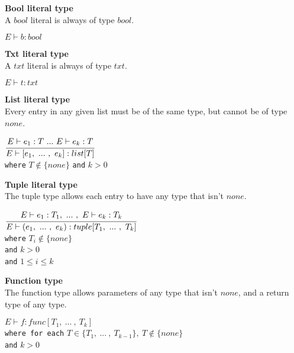\textbf{Bool literal type}\\
A $bool$ literal is always of type $bool$.

\begin{center}
	\begin{math}
	E \vdash b : bool
	\end{math}
\end{center}

\textbf{Txt literal type}\\
A $txt$ literal is always of type $txt$.

\begin{center}
	\begin{math}
	E \vdash t : txt
	\end{math}
\end{center}

\textbf{List literal type}\\
Every entry in any given list must be of the same type, but cannot be of type $none$.

\begin{center}
	\begin{math}
	\cfrac
	{E \vdash e_1 : T\ .
		.
		.
		\ E \vdash e_k : T}
	{E \vdash [e_1,\ .
		.
		.
		\ , \ e_k] : list[T]}
	\end{math}
	\\[1\baselineskip]
	\texttt{where} $T \notin \{none\}$
	\texttt{and} $k > 0$
\end{center}

\textbf{Tuple literal type}\\
The tuple type allows each entry to have any type that isn't $none$.

\begin{center}
	\begin{math}
	\cfrac
	{E \vdash e_1 : T_1,\ .
	.
	.
	\ , \ E \vdash e_k : T_k}
	{E \vdash (e_1,\ .
		.
		.
		\ ,\ e_k) : tuple[T_1, \ .
		.
		.
		\ ,\ T_k]}
	\end{math}
	\\[1\baselineskip]
	\texttt{where} $T_i \notin \{none\}$\\
	\texttt{and} $k > 0$\\
	\texttt{and} $1 \le i \le k$
\end{center}

\textbf{Function type}\\
The function type allows parameters of any type that isn't $none$, and a return type of any type.

\begin{center}
	\begin{math}
	E \vdash f : func[T_1,\ .
	.
	.
	\ ,\ T_k]
	\end{math}
	\\[1\baselineskip]
	\texttt{where for each} $T \in \{T_1,\ .
	.
	.
	\ ,\ T_{k-1}\},\ T \notin \{none\}$\\
	\texttt{and} $k > 0$
\end{center}

